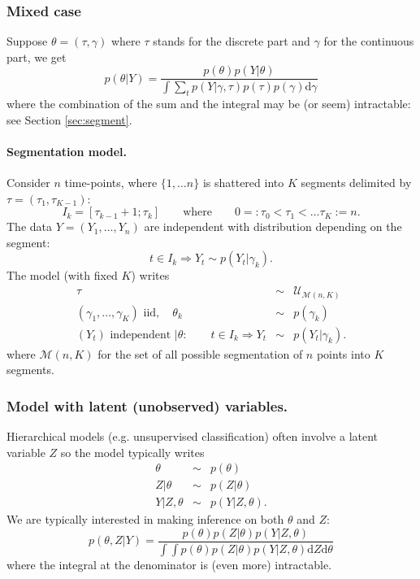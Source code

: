 \documentclass[12pt]{article}
\newcommand{\dd}{\text{d}}
\newcommand{\Mcal}{\mathcal{M}}
\begin{document}
\subsubsection{Mixed case}
Suppose $\theta = (\tau, \gamma)$ where $\tau$ stands for the discrete part and $\gamma$ for the continuous part, we get
$$
p(\theta|Y) = \frac{p(\theta) p(Y|\theta)}{\int \sum_t p(Y|\gamma, \tau) p(\tau) p(\gamma) \dd \gamma}
$$
where the combination of the sum and the integral may be (or seem) intractable: see Section \ref{sec:segment}.

\paragraph{Segmentation model.} 
Consider $n$ time-points, where $\{1, \dots n\}$ is shattered into $K$ segments delimited by $\tau = (\tau_1, \tau_{K-1})$:
$$
I_k = [\tau_{k-1}+1; \tau_k]
\qquad \text{where} \qquad
0 =: \tau_0 < \tau_1 < \dots \tau_K := n.
$$
The data $Y = (Y_1, \dots, Y_n)$ are independent with distribution depending on the segment:
$$
t \in I_k \Rightarrow Y_t \sim p(Y_t| \gamma_k).
$$
The model (with fixed $K$) writes
\begin{eqnarray*}
  \tau & \sim &  \mathcal{U}_{\Mcal(n, K)} \\
  (\gamma_1, \dots, \gamma_K) \text{ iid}, \quad \theta_k & \sim & p(\gamma_k) \\
 (Y_t) \text{ independent } | \theta: \qquad t \in I_k \Rightarrow Y_t & \sim & p(Y_t| \gamma_k).
\end{eqnarray*}
where $\Mcal(n, K)$ for the set of all possible segmentation of $n$ points into $K$ segments. 

\subsubsection{Model with latent (unobserved) variables.}
Hierarchical models (e.g. unsupervised classification) often involve a latent variable $Z$ so the model typically writes
\begin{eqnarray*}
 \theta & \sim & p(\theta) \\
 Z | \theta & \sim & p(Z|\theta) \\
 Y | Z, \theta & \sim & p(Y|Z, \theta).
\end{eqnarray*}
We are typically interested in making inference on both $\theta$ and $Z$:
$$
p(\theta, Z|Y) = \frac{p(\theta) p(Z|\theta) p(Y|Z, \theta)}{\int \int p(\theta) p(Z|\theta) p(Y|Z, \theta) \dd Z \dd \theta}
$$
where the integral at the denominator is (even more) intractable.
\end{document}

